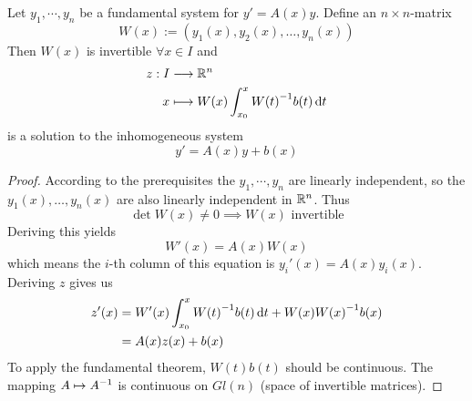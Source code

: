 \documentclass[../../script.tex]{subfiles}
\begin{document}
\begin{thm}
    Let $y_1, \cdots, y_n$ be a fundamental system for $y' = A(x) y$.
    Define an $n \times n$-matrix 
    \[
        W(x) := (y_1(x), y_2(x), \dots, y_n(x))
    \]
    Then $W(x)$ is invertible $\forall x \in I$ and 
    \begin{align*}
        z: I &\longrightarrow \mathbb{R}^n \\
        x &\longmapsto W(x) \int_{x_0}^x {W(t)}^{-1}b(t) \dd{t}
    \end{align*}
    is a solution to the inhomogeneous system 
    \[
        y' = A(x)y + b(x)
    \]
\end{thm}
\begin{proof}
    According to the prerequisites the $y_1, \cdots, y_n$ are linearly independent, so the $y_1(x), \dots, y_n(x)$ are also linearly independent in $\mathbb{R}^n$.
    Thus 
    \begin{equation}
        \det W(x) \ne 0 \implies W(x) \text{ invertible}
    \end{equation}
    Deriving this yields 
    \begin{equation}
        W'(x) = A(x)W(x)
    \end{equation}
    which means the $i$-th column of this equation is $y_i'(x) = A(x)y_i(x)$.
    Deriving $z$ gives us 
    \begin{equation}
        \begin{split}
            z'(x) &= W'(x) \int_{x_0}^x {W(t)}^{-1} b(t) \dd{t} + W(x){W(x)}^{-1} b(x) \\
            &= A(x) z(x) + b(x)
        \end{split}
    \end{equation}
    To apply the fundamental theorem, $W(t)b(t)$ should be continuous.
    The mapping $A \mapsto {A}^{-1}$ is continuous on $Gl(n)$ (space of invertible matrices).
\end{proof}
\end{document}
